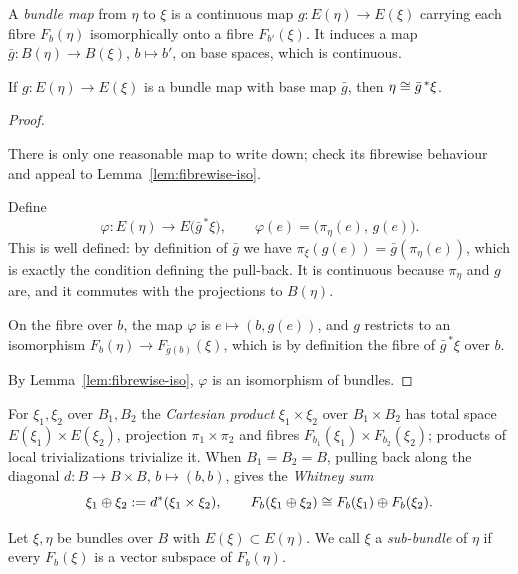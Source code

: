 \begin{definition}
A \emph{bundle map} from $\eta$ to $\xi$ is a continuous map
$g\colon E(\eta)\to E(\xi)$ carrying each fibre $F_b(\eta)$ isomorphically onto
a fibre $F_{b'}(\xi)$. It induces a map $\bar g\colon B(\eta)\to B(\xi)$,
$b\mapsto b'$, on base spaces, which is continuous.
\end{definition}

\begin{lemma}\label{lem:bundle-map-pullback}
If $g\colon E(\eta)\to E(\xi)$ is a bundle map with base map $\bar g$, then
$\eta\cong\bar g^{\,*}\xi$.
\end{lemma}

\begin{proof}
\begin{strategy}
There is only one reasonable map to write down; check its fibrewise behaviour
and appeal to Lemma~\ref{lem:fibrewise-iso}.
\end{strategy}

 Define
\[
\varphi\colon E(\eta)\longrightarrow E\big(\bar g^{\,*}\xi\big),
\qquad
\varphi(e)=\big(\pi_\eta(e),\,g(e)\big).
\]
This is well defined: by definition of $\bar g$ we have
$\pi_\xi(g(e))=\bar g(\pi_\eta(e))$, which is exactly the condition defining the
pull-back. It is continuous because $\pi_\eta$ and $g$ are, and it commutes with
the projections to $B(\eta)$.

 On the fibre over $b$, the map $\varphi$ is
$e\mapsto(b,g(e))$, and $g$ restricts to an isomorphism
$F_b(\eta)\to F_{\bar g(b)}(\xi)$, which is by definition the fibre of
$\bar g^{\,*}\xi$ over $b$.

 By Lemma~\ref{lem:fibrewise-iso}, $\varphi$ is an isomorphism of
bundles.
\end{proof}

\begin{construction}
For $\xi_1,\xi_2$ over $B_1,B_2$ the \emph{Cartesian product}
$\xi_1\times\xi_2$ over $B_1\times B_2$ has total space
$E(\xi_1)\times E(\xi_2)$, projection $\pi_1\times\pi_2$ and fibres
$F_{b_1}(\xi_1)\times F_{b_2}(\xi_2)$; products of local trivializations
trivialize it. When $B_1=B_2=B$, pulling back along the diagonal
$d\colon B\to B\times B$, $b\mapsto(b,b)$, gives the \emph{Whitney sum}
\[
\xi_1\oplus\xi_2:=d^*(\xi_1\times\xi_2),
\qquad
F_b(\xi_1\oplus\xi_2)\cong F_b(\xi_1)\oplus F_b(\xi_2).
\]
\end{construction}

\begin{definition}
Let $\xi,\eta$ be bundles over $B$ with $E(\xi)\subset E(\eta)$. We call $\xi$ a
\emph{sub-bundle} of $\eta$ if every $F_b(\xi)$ is a vector subspace of
$F_b(\eta)$.
\end{definition}

